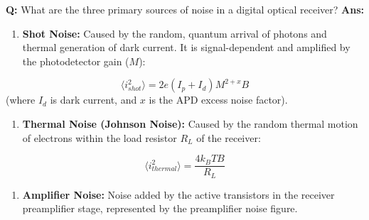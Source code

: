 \documentclass[10pt,a4paper,twocolumn]{article}
\begin{document}
\begin{tcolorbox}[
  colback=white,
  colframe=UnitColorFour,
  colbacktitle=gray!10!white,
  coltitle=black,
  fonttitle=\bfseries\sffamily\small,
  title={Unit IV $\bullet$ Card 6: Noise in Optical Receivers},
  boxrule=1.2pt,
  arc=2mm,
  outer arc=2mm,
  boxsep=1.5mm,
  top=1mm,
  bottom=1mm,
  left=1.5mm,
  right=1.5mm,
  before skip=2.5mm,
  after skip=2.5mm
]
\textbf{Q:} What are the three primary sources of noise in a digital optical receiver?
\tcbline
\textbf{Ans:} \begin{enumerate}
  \item \textbf{Shot Noise:} Caused by the random, quantum arrival of photons and thermal generation of dark current. It is signal-dependent and amplified by the photodetector gain ($M$):
\end{enumerate}
        \[ \langle i_{shot}^2 \rangle = 2e(I_p + I_d)M^{2+x}B \] (where $I_d$ is dark current, and $x$ is the APD excess noise factor).
\begin{enumerate}
  \item \textbf{Thermal Noise (Johnson Noise):} Caused by the random thermal motion of electrons within the load resistor $R_L$ of the receiver:
\end{enumerate}
        \[ \langle i_{thermal}^2 \rangle = \frac{4 k_B T B}{R_L} \]
\begin{enumerate}
  \item \textbf{Amplifier Noise:} Noise added by the active transistors in the receiver preamplifier stage, represented by the preamplifier noise figure.
\end{enumerate}
\end{tcolorbox}
\end{document}
